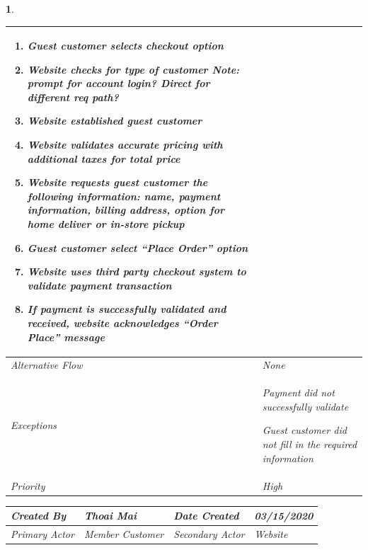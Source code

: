 \documentclass{scrreprt}
\theoremstyle{funreq}
\newtheorem{funreq}{}
\begin{document}
\begin{funreq}
\begin{table}[H]
{\begin{tabularx}{\columnwidth}{|l|X|}
					
					\begin{enumerate}
					\item Guest customer selects checkout option
					
					\item Website checks for type of customer \textit{Note: prompt for account login? Direct for different req path?}
					
					\item Website established guest customer
					
					\item Website validates accurate pricing with additional taxes for total price
					
					\item Website requests guest customer the following information: name, payment information, billing address, option for home deliver or in-store pickup
					
					\item Guest customer select “Place Order” option
					
					\item Website uses third party checkout system to validate payment transaction
					
					\item If payment is successfully validated and received, website acknowledges “Order Place” message
				\end{enumerate}
					\\ \hline
					
					Alternative Flow & None                                       \\ \hline
					Exceptions       & Payment did not successfully validate
					
					Guest customer did not fill in the required information
					\\ \hline
					Priority & High                                       \\ \hline
				\end{tabularx}%
			}
		\end{table}
		\begin{table}[H]
			\begin{tabularx}{\columnwidth}{|X|X|X|X|}
				\hline
				Created By    & Thoai Mai & Date Created    & 03/15/2020 \\ \hline
				Primary Actor & Member Customer        & Secondary Actor & Website \\ \hline
			\end{tabularx}
		

\end{table}
\end{funreq}
\end{document}
